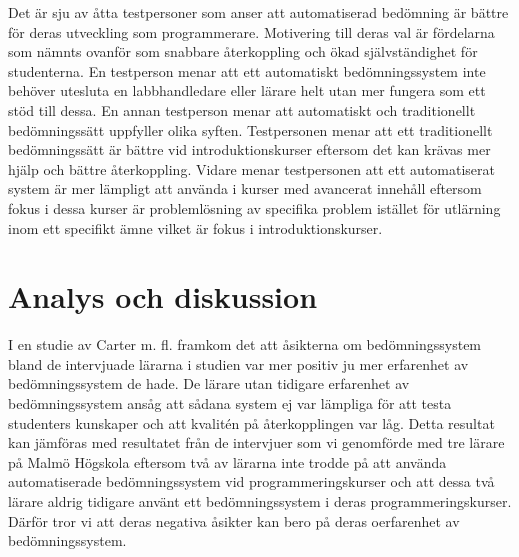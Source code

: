 \documentclass[a4paper,11pt]{article}
\begin{document}
{Det är sju av åtta testpersoner som anser att automatiserad bedömning är bättre för deras utveckling som programmerare. Motivering till deras val är fördelarna som nämnts ovanför som snabbare återkoppling och ökad självständighet för studenterna. En testperson menar att ett automatiskt bedömningssystem inte behöver utesluta en labbhandledare eller lärare helt utan mer fungera som ett stöd till dessa. En annan testperson menar att automatiskt och traditionellt bedömningssätt uppfyller olika syften. Testpersonen menar att ett traditionellt bedömningssätt är bättre vid introduktionskurser eftersom det kan krävas mer hjälp och bättre återkoppling. Vidare menar testpersonen att ett automatiserat system är mer lämpligt att använda i kurser med avancerat innehåll eftersom fokus i dessa kurser är problemlösning av specifika problem istället för utlärning inom ett specifikt ämne vilket är fokus i introduktionskurser.

\newpage
\section{Analys och diskussion}

I en studie av Carter m. fl. \cite{carter} framkom det att åsikterna om bedömningssystem bland de intervjuade lärarna i studien var mer positiv ju mer erfarenhet av bedömningssystem de hade. De lärare utan tidigare erfarenhet av bedömningssystem ansåg att sådana system ej var lämpliga för att testa studenters kunskaper och att kvalitén på återkopplingen var låg. Detta resultat kan jämföras  med resultatet från de intervjuer som vi genomförde med tre lärare på Malmö Högskola eftersom två av lärarna inte trodde på att använda automatiserade bedömningssystem vid programmeringskurser och att dessa två lärare aldrig tidigare använt ett bedömningssystem i deras programmeringskurser.  Därför tror vi att deras negativa åsikter kan bero på deras oerfarenhet av bedömningssystem.

}
\end{document}
